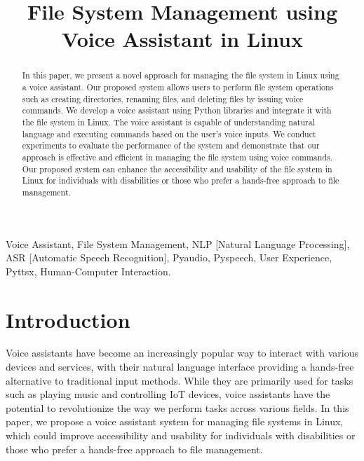 \documentclass[conference]{IEEEtran}
\begin{document}
\title{File System Management using Voice Assistant in Linux}

\author{
\and 
{}
\and 
{}
\and 
{}
}

\maketitle

\begin{abstract}
In this paper, we present a novel approach for managing the file system in Linux using a voice assistant. Our proposed system allows users to perform file system operations such as creating directories, renaming files, and deleting files by issuing voice commands. We develop a voice assistant using Python libraries and integrate it with the file system in Linux. The voice assistant is capable of understanding natural language and executing commands based on the user's voice inputs. We conduct experiments to evaluate the performance of the system and demonstrate that our approach is effective and efficient in managing the file system using voice commands. Our proposed system can enhance the accessibility and usability of the file system in Linux for individuals with disabilities or those who prefer a hands-free approach to file management.
\end{abstract}

\begin{IEEEkeywords}
Voice Assistant, File System Management, NLP [Natural Language Processing], ASR [Automatic Speech Recognition], Pyaudio, Pyspeech, User Experience, Pyttsx, Human-Computer Interaction.
\end{IEEEkeywords}

\section{Introduction}
Voice assistants have become an increasingly popular way to interact with various devices and services, with their natural language interface providing a hands-free alternative to traditional input methods. While they are primarily used for tasks such as playing music and controlling IoT devices, voice assistants have the potential to revolutionize the way we perform tasks across various fields. In this paper, we propose a voice assistant system for managing file systems in Linux, which could improve accessibility and usability for individuals with disabilities or those who prefer a hands-free approach to file management.
\end{document}
